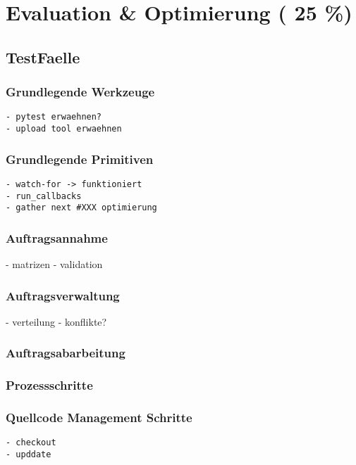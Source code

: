 \chapter{Evaluation \& Optimierung ( 25 \%)}

\section{TestFaelle}
\subsection{Grundlegende Werkzeuge}

\begin{verbatim}
- pytest erwaehnen?
- upload tool erwaehnen
\end{verbatim}

\subsection{Grundlegende Primitiven}

\begin{verbatim}
- watch-for -> funktioniert
- run_callbacks
- gather next #XXX optimierung
\end{verbatim}

\subsection{Auftragsannahme}
- matrizen
- validation

\subsection{Auftragsverwaltung}
- verteilung
- konflikte?

\subsection{Auftragsabarbeitung}

\subsection{Prozessschritte}
\subsection{Quellcode Management Schritte}

\begin{verbatim}
- checkout
- upddate
\end{verbatim}

